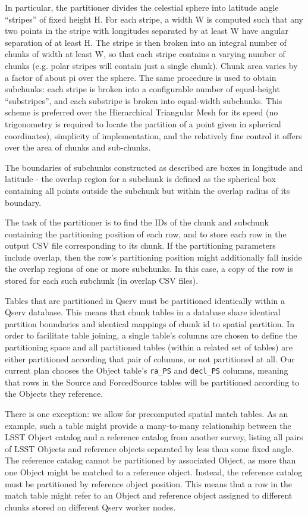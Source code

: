 \documentclass[DM,toc]{lsstdoc}
\begin{document}
In particular, the partitioner divides the celestial sphere into
latitude angle ``stripes'' of fixed height H. For each stripe, a width W
is computed such that any two points in the stripe with longitudes
separated by at least W have angular separation of at least H. The
stripe is then broken into an integral number of chunks of width at
least W, so that each stripe contains a varying number of chunks (e.g.
polar stripes will contain just a single chunk). Chunk area varies by a
factor of about pi over the sphere. The same procedure is used to obtain
subchunks: each stripe is broken into a configurable number of
equal-height ``substripes'', and each substripe is broken into
equal-width subchunks. This scheme is preferred over the Hierarchical
Triangular Mesh for its speed (no trigonometry is required to locate the
partition of a point given in spherical coordinates), simplicity of
implementation, and the relatively fine control it offers over the area
of chunks and sub-chunks.

The boundaries of subchunks constructed as described are boxes in
longitude and latitude - the overlap region for a subchunk is defined as
the spherical box containing all points outside the subchunk but within
the overlap radius of its boundary.

The task of the partitioner is to find the IDs of the chunk and subchunk
containing the partitioning position of each row, and to store each row
in the output CSV file corresponding to its chunk. If the partitioning
parameters include overlap, then the row's partitioning position might
additionally fall inside the overlap regions of one or more subchunks.
In this case, a copy of the row is stored for each such subchunk (in
overlap CSV files).

Tables that are partitioned in Qserv must be partitioned identically
within a Qserv database. This means that chunk tables in a database
share identical partition boundaries and identical mappings of chunk id
to spatial partition. In order to facilitate table joining, a single
table's columns are chosen to define the partitioning space and all
partitioned tables (within a related set of tables) are either
partitioned according that pair of columns, or not partitioned at all.
Our current plan chooses the Object table's \texttt{ra\_PS} and
\texttt{decl\_PS} columns, meaning that rows in the Source and
ForcedSource tables will be partitioned according to the Objects they
reference.

There is one exception: we allow for precomputed spatial match tables.
As an example, such a table might provide a many-to-many relationship
between the LSST Object catalog and a reference catalog from another
survey, listing all pairs of LSST Objects and reference objects
separated by less than some fixed angle. The reference catalog cannot be
partitioned by associated Object, as more than one Object might be
matched to a reference object. Instead, the reference catalog must be
partitioned by reference object position. This means that a row in the
match table might refer to an Object and reference object assigned to
different chunks stored on different Qserv worker nodes.
\end{document}
